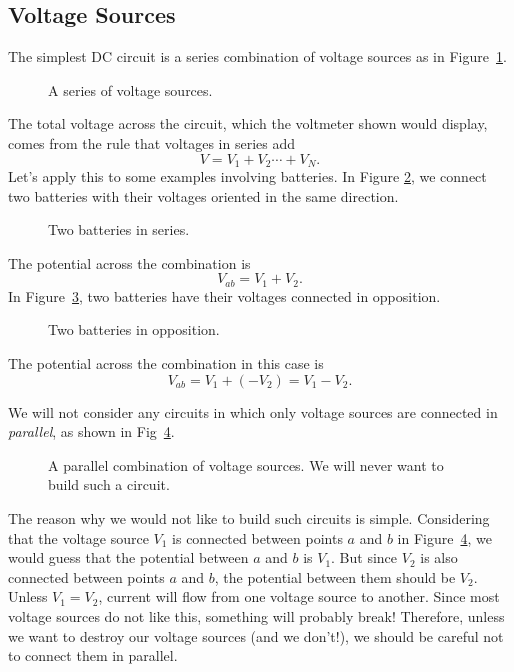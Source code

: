 \subsection{Voltage Sources}

The simplest DC circuit is a series combination of voltage sources as in 
Figure~\ref{fig:DC:voltseries}. 
\begin{figure}[htb]
\centerline{\epsfxsize=9cm }
\caption{A series of voltage sources.}
\label{fig:DC:voltseries}
\end{figure}
The total voltage across the circuit, which the voltmeter shown would display, 
comes from the rule that voltages in series add
$$
V = V_1 + V_2 \cdots + V_N.
$$
Let's apply this to some examples involving batteries.  In Figure 
\ref{fig:DC:battalign}, we connect two batteries with their voltages oriented 
in the same direction.  
\begin{figure}[htb]
\centerline{\epsfxsize=5cm }
\caption{Two batteries in series.}
\label{fig:DC:battalign}
\end{figure}
The potential across the combination is
$$
V_{ab} = V_1 + V_2.
$$
In Figure~\ref{fig:DC:battopp}, two batteries have their voltages connected
in opposition.  
\begin{figure}[htb]
\centerline{\epsfxsize=5cm }
\caption{Two batteries in opposition.}
\label{fig:DC:battopp}
\end{figure}
The potential across the combination in this case is
$$
V_{ab} = V_1 + (-V_2)=V_1 - V_2.
$$
\clearpage

We will not consider any circuits in which only voltage sources are connected 
in {\it parallel}, as shown in Fig~\ref{fig:DC:voltparallel}. 
\begin{figure}[htb]
\centerline{\epsfxsize=4cm }
\caption{A parallel combination of voltage sources. We will never want to build
such a circuit.}
\label{fig:DC:voltparallel}
\end{figure}
The reason why we would not like to build such circuits is simple. Considering 
that the voltage source $V_1$ is connected between points $a$ and $b$ in 
Figure~\ref{fig:DC:voltparallel}, we would guess that the potential between $a$
and $b$ is $V_1$.  But since $V_2$ is also connected between points $a$ and 
$b$, the potential between them should be $V_2$.  Unless $V_1=V_2$, current 
will flow from one voltage source to another. Since most voltage sources do 
not like this, something will probably break!  Therefore, unless we want to 
destroy our voltage sources (and we don't!), we should be careful not to 
connect them in parallel.

